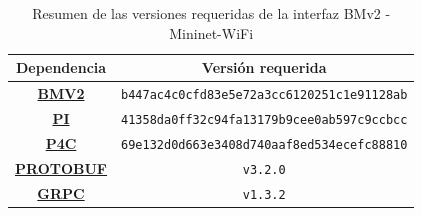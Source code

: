 \begin{table}[ht]
\centering

\begin{tabular}{|c|c|}
\hline
\rowcolor[HTML]{EFEFEF} 
{\color[HTML]{24292E} \textbf{Dependencia}} & {\color[HTML]{24292E} \textbf{Versión requerida}} \\ \hline
\href{https://github.com/p4lang/behavioral-model}{\textbf{BMV2}}                                        & \texttt{b447ac4c0cfd83e5e72a3cc6120251c1e91128ab}          \\ \hline
\href{https://github.com/p4lang/PI}{\textbf{PI}}                                          & \texttt{41358da0ff32c94fa13179b9cee0ab597c9ccbcc}          \\ \hline
\href{https://github.com/p4lang/p4c}{\textbf{P4C}}                                         & \texttt{69e132d0d663e3408d740aaf8ed534ecefc88810}         \\ \hline
\href{https://github.com/protocolbuffers/protobuf}{\textbf{PROTOBUF}}                                    & \texttt{v3.2.0}                                        \\ \hline
\href{https://github.com/grpc}{\textbf{GRPC}}                                        & \texttt{v1.3.2}                                           \\ \hline
\end{tabular}%
\caption{Resumen de las versiones requeridas de la interfaz BMv2 - Mininet-WiFi}
\label{tab:mn-wifi_bmv2_integration_deps}
\end{table}


